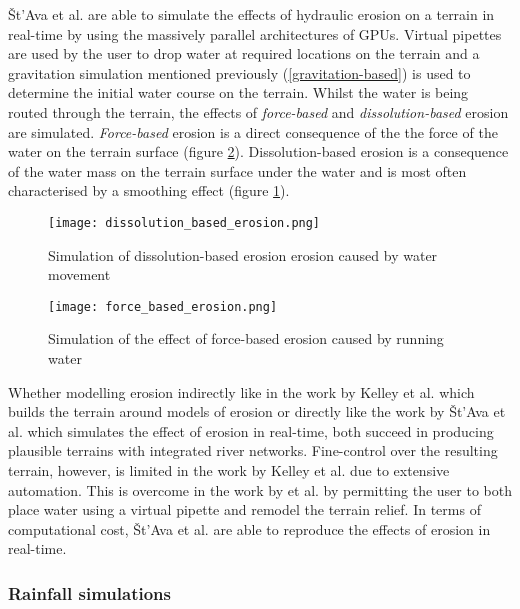 Št'Ava et al. \cite{StAva2008} are able to simulate the effects of hydraulic erosion on a terrain in real-time by using the massively parallel architectures of GPUs. Virtual pipettes are used by the user to drop water at required locations on the terrain and a gravitation simulation mentioned previously (\ref{gravitation-based}) is used to determine the initial water course on the terrain. Whilst the water is being routed through the terrain, the effects of \textit{force-based} and \textit{dissolution-based} erosion are simulated. \textit{Force-based} erosion is a direct consequence of the the force of the water on the terrain surface (figure \ref{force-based erosion}). Dissolution-based erosion is a consequence of the water mass on the terrain surface under the water and is most often characterised by a smoothing effect (figure \ref{dissolution_based_erosion-based erosion}).\\

\begin{figure}[h]
  \centering
	\label{dissolution_based_erosion-based erosion}
	\texttt{[image: dissolution\_based\_erosion.png]}
	\caption{Simulation of dissolution-based erosion erosion caused by water movement\cite{StAva2008}}
\end{figure}

\begin{figure}[h]
  \centering
	\label{force-based erosion}
	\texttt{[image: force\_based\_erosion.png]}
	\caption{Simulation of the effect of force-based erosion caused by running water \cite{StAva2008}}
\end{figure}

Whether modelling erosion indirectly like in the work by Kelley et al. \cite{Kelley1988} which builds the terrain around models of erosion or directly like the work by Št'Ava et al. \cite{StAva2008} which simulates the effect of erosion in real-time, both succeed in producing plausible terrains with integrated river networks. Fine-control over the resulting terrain, however, is limited in the work by Kelley et al. \cite{Kelley1988} due to extensive automation. This is overcome in the work by \cite{StAva2008} et al. by permitting the user to both place water using a virtual pipette and remodel the terrain relief. In terms of computational cost, Št'Ava et al. \cite{StAva2008} are able to reproduce the effects of erosion in real-time.  

\subsubsection{Rainfall simulations}

